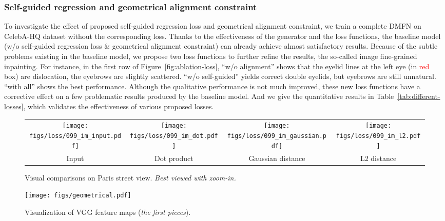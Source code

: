 \documentclass[journal]{IEEEtran}
\begin{document}
\subsubsection{Self-guided regression and geometrical alignment constraint}
To investigate the effect of proposed self-guided regression loss and geometrical alignment constraint, we train a complete DMFN on CelebA-HQ dataset without the corresponding loss. Thanks to the effectiveness of the generator and the loss functions, the baseline model (w/o self-guided regression loss \& geometrical alignment constraint) can already achieve almost satisfactory results. Because of the subtle problems existing in the baseline model, we propose two loss functions to further refine the results, the so-called image fine-grained inpainting. For instance, in the first row of Figure~\ref{fig:ablation-loss}, ``w/o alignment'' shows that the eyelid lines at the left eye (in \textcolor{red}{red} box) are dislocation, the eyebrows are slightly scattered. ``w/o self-guided'' yields correct double eyelids, but eyebrows are still unnatural. ``with all'' shows the best performance. Although the qualitative performance is not much improved, these new loss functions have a corrective effect on a few problematic results produced by the baseline model. And we give the quantitative results in Table~\ref{tab:different-losses}, which validates the effectiveness of various proposed losses.

\begin{figure*}[ht]
	\centering
	\begin{tabular}{cccc}
		\texttt{[image: figs/loss/099\_im\_input.pdf]} &
		\hspace{-3mm}
		\texttt{[image: figs/loss/099\_im\_dot.pdf]} &
		\hspace{-3mm}
		\texttt{[image: figs/loss/099\_im\_gaussian.pdf]} &
		\hspace{-3mm}
		\texttt{[image: figs/loss/099\_im\_l2.pdf]} \\
		
		Input & Dot product & Gaussian distance & L2 distance \\
	\end{tabular}
	\caption{Visual comparisons on Paris street view. \textit{Best viewed with zoom-in.}}
	\label{fig:loss}
\end{figure*}


\begin{figure*}[htpb]
	\centering
	\texttt{[image: figs/geometrical.pdf]}
	\caption{Visualization of VGG feature maps (\textit{the first  pieces}).}
	\label{fig:visualization}
\end{figure*}
\end{document}
